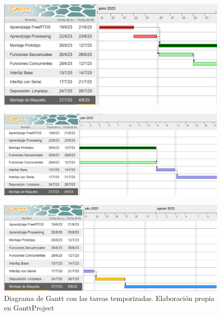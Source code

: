    \begin{figure}[H]
        \centering
        \includegraphics[width=1\textwidth]{imagenes/gantt_base_p1.png}
    \end{figure}
    

    
    \begin{figure}[H]
        \centering
        \includegraphics[width=1\textwidth]{imagenes/gantt_base_p2.png}
    \end{figure}
    

    
    \begin{figure}[H]
        \centering
        \includegraphics[width=1\textwidth]{imagenes/gantt_base_p3.png}
        \caption{Diagrama de Gantt con las tareas temporizadas. Elaboración propia en GanttProject}
    \end{figure}
    

